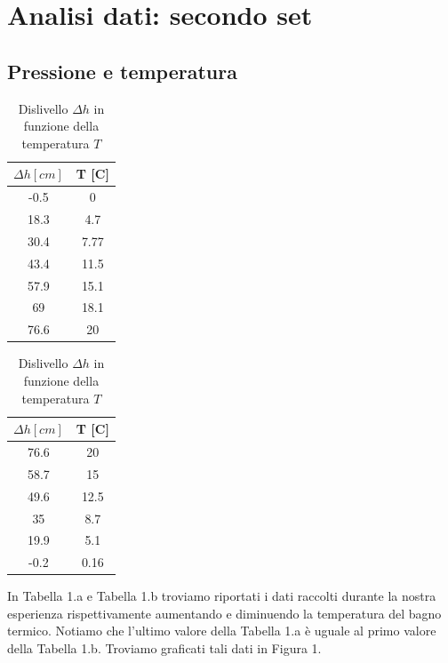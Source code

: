 \section{Analisi dati: secondo set}
\subsection{Pressione e temperatura}

\begin{table}[H]
\centering

	\begin{subtable}{.5\textwidth}
		\centering
		\begin{tabular}{|c|c|} \hline
			\textbf{$\Delta h {[cm]}$ } & \textbf{T {[\degree C]} }  \\ \hline
			-0.5 & 0  \\ \hline
			18.3 & 4.7  \\ \hline
			30.4 & 7.77  \\ \hline
			43.4 & 11.5  \\ \hline
			57.9 & 15.1  \\ \hline
			69 & 18.1  \\ \hline
			76.6 & 20  \\ \hline
		\end{tabular}
		\caption{Aumento della temperatura}
	\end{subtable}%
	\begin{subtable}{.5\textwidth}
	\centering
	\begin{tabular}{|c|c|} \hline
		\textbf{$\Delta h {[cm]}$ } & \textbf{T {[\degree C]} }  \\ \hline
		76.6 & 20  \\ \hline
		58.7 & 15  \\ \hline
		49.6 & 12.5  \\ \hline
		35 & 8.7  \\ \hline
		19.9 & 5.1  \\ \hline
		-0.2 & 0.16  \\ \hline
	\end{tabular}
	\caption{Diminuzione della temperatura}
\end{subtable}

\caption{Dislivello $\Delta h$ in funzione della temperatura $T$}
\end{table}
In Tabella 1.a e Tabella 1.b troviamo riportati i dati raccolti durante la nostra esperienza rispettivamente aumentando e diminuendo la temperatura del bagno termico. 
Notiamo che l'ultimo valore della Tabella 1.a è uguale al primo valore della Tabella 1.b.
Troviamo graficati tali dati in Figura 1. 


